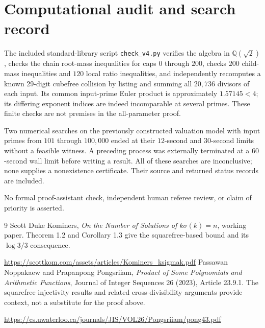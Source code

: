 \documentclass[11pt,a4paper]{article}
\theoremstyle{remark}\newtheorem*{remark}{Remark}
\begin{document}
\section{Computational audit and search record}
The included standard-library script \texttt{check\_v4.py} verifies the algebra in $\mathbb Q(\sqrt2)$, checks the chain root-mass inequalities for caps $0$ through $200$, checks $200$ child-mass inequalities and $120$ local ratio inequalities, and independently recomputes a known 29-digit cubefree collision by listing and summing all $20{,}736$ divisors of each input. Its common input-prime Euler product is approximately $1.57145<4$; its differing exponent indices are indeed incomparable at several primes. These finite checks are not premises in the all-parameter proof.

Two numerical searches on the previously constructed valuation model with input primes from $101$ through $100{,}000$ ended at their $12$-second and $30$-second limits without a feasible witness. A preceding process was externally terminated at a $60$-second wall limit before writing a result. All of these searches are inconclusive; none supplies a nonexistence certificate. Their source and returned status records are included.

No formal proof-assistant check, independent human referee review, or claim of priority is asserted.

\begin{thebibliography}{9}
Scott Duke Kominers, \emph{On the Number of Solutions of $k\sigma(k)=n$}, working paper. Theorem 1.2 and Corollary 1.3 give the squarefree-based bound and its $\log3/3$ consequence.\par
\url{https://scottkom.com/assets/articles/Kominers_ksigmak.pdf}
Passawan Noppakaew and Prapanpong Pongsriiam, \emph{Product of Some Polynomials and Arithmetic Functions}, Journal of Integer Sequences 26 (2023), Article 23.9.1. The squarefree injectivity results and related cross-divisibility arguments provide context, not a substitute for the proof above.\par
\url{https://cs.uwaterloo.ca/journals/JIS/VOL26/Pongsriiam/pong43.pdf}
\end{thebibliography}
\end{document}
